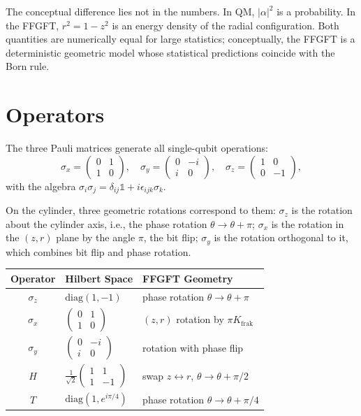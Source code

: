 The conceptual difference lies not in the numbers. In QM,
$|\alpha|^2$ is a probability. In the FFGFT, $r^2 = 1-z^2$
is an energy density of the radial configuration. Both quantities are numerically equal for large statistics; conceptually, the FFGFT is a
deterministic geometric model whose statistical predictions
coincide with the Born rule.

\section{Operators}

The three Pauli matrices generate all single-qubit operations:
\begin{equation}
  \sigma_x = \begin{pmatrix}0&1\\1&0\end{pmatrix},\quad
  \sigma_y = \begin{pmatrix}0&-i\\i&0\end{pmatrix},\quad
  \sigma_z = \begin{pmatrix}1&0\\0&-1\end{pmatrix},
\end{equation}
with the algebra $\sigma_i\sigma_j = \delta_{ij}\mathbb{1}+i\epsilon_{ijk}\sigma_k$.

On the cylinder, three geometric rotations correspond to them:
$\sigma_z$ is the rotation about the cylinder axis, i.e., the phase rotation
$\theta\to\theta+\pi$; $\sigma_x$ is the rotation in the $(z,r)$ plane by
the angle $\pi$, the bit flip; $\sigma_y$ is the rotation orthogonal to it, which
combines bit flip and phase rotation.

\begin{center}
\small\renewcommand{\arraystretch}{1.5}
\begin{tabular}{cp{2.6cm}p{3.6cm}}
\toprule
\textbf{Operator} & \textbf{Hilbert Space} & \textbf{FFGFT Geometry} \\
\midrule
$\sigma_z$ & $\mathrm{diag}(1,-1)$ & phase rotation $\theta\to\theta+\pi$ \\
$\sigma_x$ & $\begin{pmatrix}0&1\\1&0\end{pmatrix}$ & $(z,r)$ rotation by $\pi K_{\mathrm{frak}}$ \\
$\sigma_y$ & $\begin{pmatrix}0&-i\\i&0\end{pmatrix}$ & rotation with phase flip \\
$H$ & $\frac{1}{\sqrt2}\begin{pmatrix}1&1\\1&-1\end{pmatrix}$ & swap $z\leftrightarrow r$, $\theta\to\theta+\pi/2$ \\
$T$ & $\mathrm{diag}(1,e^{i\pi/4})$ & phase rotation $\theta\to\theta+\pi/4$ \\
\bottomrule
\end{tabular}
\end{center}

